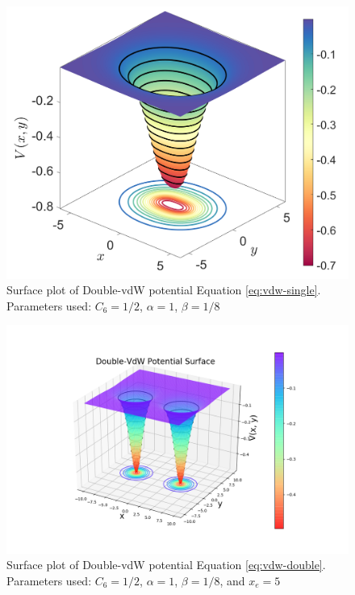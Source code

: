 \documentclass[10pt,aps,onecolumn,superscriptaddress]{revtex4-2}
\begin{document}
\begin{figure}
    \centering
    \includegraphics[scale=0.3]{untitled.png}
    \caption{Surface plot of Double-vdW potential Equation \eqref{eq:vdw-single}. Parameters used: $C_6 = 1/2$, $\alpha = 1$, $\beta = 1/8$}
    \label{fig:vdw-single_surface}
\end{figure}


\begin{figure}
    \centering
    \includegraphics[scale=0.5]{notebooks/figures/double-vdw_surface.png}
    \caption{Surface plot of Double-vdW potential Equation \eqref{eq:vdw-double}. Parameters used: $C_6 = 1/2$, $\alpha = 1$, $\beta = 1/8$, and  $x_e = 5$ }
    \label{fig:vdw-double_surface}
\end{figure}

\newpage


\end{document}

